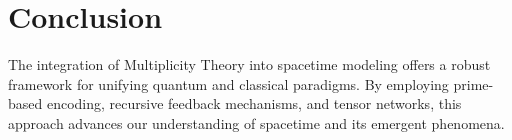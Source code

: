\documentclass{article}
\theoremstyle{plain}
\begin{document}
\section{Conclusion}
The integration of Multiplicity Theory into spacetime modeling offers a robust framework for unifying quantum and classical paradigms. By employing prime-based encoding, recursive feedback mechanisms, and tensor networks, this approach advances our understanding of spacetime and its emergent phenomena.


\nocite{*}


\end{document}
